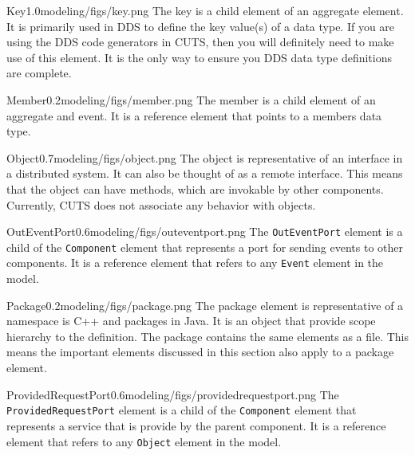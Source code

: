 \begin{modelelement}{Key}{1.0}{modeling/figs/key.png}
The key is a child element of an aggregate element. It is
primarily used in DDS to define the key value(s) of a data
type. If you are using the DDS code generators in CUTS, then
you will definitely need to make use of this element. It
is the only way to ensure you DDS data type definitions
are complete.
\end{modelelement}

\begin{modelelement}{Member}{0.2}{modeling/figs/member.png}
The member is a child element of an aggregate and event. It
is a reference element that points to a members data type.
\end{modelelement}

\begin{modelelement}{Object}{0.7}{modeling/figs/object.png}
The object is representative of an interface
in a distributed system. It can also be thought of as
a remote interface. This means that the object can have
methods, which are invokable by other components. Currently,
CUTS does not associate any behavior with objects. 
\end{modelelement}

\begin{modelelement}{OutEventPort}{0.6}{modeling/figs/outeventport.png}
The \texttt{OutEventPort} element is a child of the \texttt{Component}
element that represents a port for sending events to other components.
It is a reference element that refers to any \texttt{Event} element in
the model.
\end{modelelement}

\clearpage

\begin{modelelement}{Package}{0.2}{modeling/figs/package.png}
The package element is representative of a 
namespace is C++ and packages in Java. It is an object
that provide scope hierarchy to the definition. The 
package contains the same elements as a file. This 
means the important elements discussed in this section
also apply to a package element. 
\end{modelelement}

\begin{modelelement}{ProvidedRequestPort}{0.6}{modeling/figs/providedrequestport.png}
The \texttt{ProvidedRequestPort} element is a child of the \texttt{Component}
element that represents a service that is provide by the parent component.
It is a reference element that refers to any \texttt{Object} element in
the model.
\end{modelelement}

